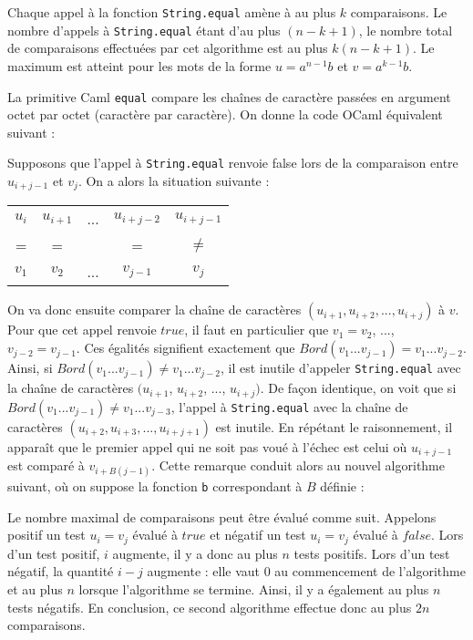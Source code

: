 

Chaque appel à la fonction \texttt{String.equal} amène à au plus $k$ comparaisons. Le nombre d'appels à \texttt{String.equal} étant d'au plus $(n-k+1)$, le nombre total de comparaisons effectuées par cet algorithme est au plus $k(n-k+1)$. Le maximum est atteint pour les mots de la forme $u=a^{n-1}b$ et $v=a^{k-1}b$.

\Q
La primitive Caml \texttt{equal} compare les chaînes de caractère passées en argument octet par octet (caractère par caractère). On donne la code OCaml équivalent suivant :



Supposons que l'appel à \texttt{String.equal} renvoie false lors de la comparaison entre $u_{i+j-1}$ et $v_j$. On a alors la situation suivante :
\begin{center}
    \begin{tabular}{ c c c c c }
        $u_i$ & $u_{i+1}$ & ... & $u_{i+j-2}$ & $u_{i+j-1}$ \\
        = & = & & = & $\neq$ \\
        $v_1$ & $v_2$ & ... & $v_{j-1}$ & $v_{j}$
    \end{tabular}
\end{center}

On va donc ensuite comparer la chaîne de caractères $(u_{i+1}, u_{i+2}, ..., u_{i+j})$ à $v$. Pour que cet appel renvoie $true$, il faut en particulier que $v_1=v_2$, ..., $v_{j-2}=v_{j-1}$. Ces égalités signifient exactement que $Bord(v_1...v_{j-1})=v_1...v_{j-2}$. Ainsi, si $Bord(v_1...v_{j-1}) \neq v_1...v_{j-2}$, il est inutile d'appeler \texttt{String.equal} avec la chaîne de caractères $(u_{i+1}$, $u_{i+2}$, ..., $u_{i+j})$. De façon identique, on voit que si $Bord(v_1...v_{j-1}) \neq v_1...v_{j-3}$, l'appel à \texttt{String.equal} avec la chaîne de caractères $(u_{i+2}, u_{i+3}, ..., u_{i+j+1})$ est inutile. En répétant le raisonnement, il apparaît que le premier appel qui ne soit pas voué à l'échec est celui où $u_{i+j-1}$ est comparé à $v_{i+B(j-1)}$. Cette remarque conduit alors au nouvel algorithme suivant, où on suppose la fonction \texttt{b} correspondant à $B$ définie :



Le nombre maximal de comparaisons peut être évalué comme suit. Appelons \og positif \fg{} un test $u_i=v_j$ évalué à $true$ et négatif un test $u_i=v_j$ évalué à $false$. Lors d'un test positif, $i$ augmente, il y a donc au plus $n$ tests positifs. Lors d'un test négatif, la quantité $i-j$ augmente : elle vaut 0 au commencement de l'algorithme et au plus $n$ lorsque l'algorithme se termine. Ainsi, il y a également au plus $n$ tests négatifs. En conclusion, ce second algorithme effectue donc au plus $2n$ comparaisons.

